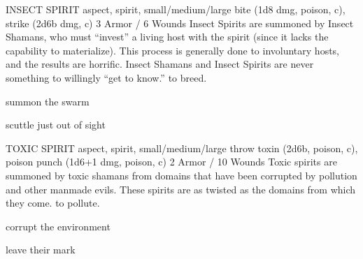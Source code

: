\documentclass[oneside,10pt]{article}
\begin{document}
\begin{multicols}{2}
\critterspec
{INSECT SPIRIT	}
{aspect, spirit, small/medium/large}
{bite (1d8 dmg, poison, c), strike (2d6b dmg, c)}
{3 Armor / 6 Wounds}
{Insect Spirits are summoned by Insect Shamans, who must ``invest'' a living host with the spirit (since it lacks the capability to materialize). This process is generally done to involuntary hosts, and the results are horrific. Insect Shamans and Insect Spirits are never something to willingly ``get to know.''}
{to breed.}
{\tcirc{} summon the swarm

\tcirc{} scuttle just out of sight}

\critterspec
{TOXIC SPIRIT	}
{aspect, spirit, small/medium/large}
{throw toxin (2d6b, poison, c), poison punch (1d6+1 dmg, poison, c)}
{2 Armor / 10 Wounds}
{Toxic spirits are summoned by toxic shamans from domains that have been corrupted by pollution and other manmade evils. These spirits are as twisted as the domains from which they come.}
{to pollute.}
{\tcirc{} corrupt the environment

\tcirc{} leave their mark}


\end{multicols}

\newpage

\end{document}
